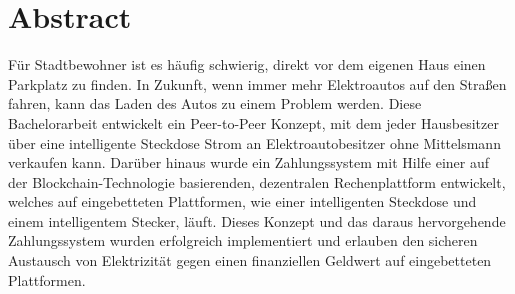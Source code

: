 \thispagestyle{empty}

\section*{Abstract}

Für Stadtbewohner ist es häufig schwierig, direkt vor dem eigenen Haus einen Parkplatz zu finden.
In Zukunft, wenn immer mehr Elektroautos auf den Straßen fahren, kann das Laden des Autos zu einem Problem werden.
Diese Bachelorarbeit entwickelt ein Peer-to-Peer Konzept, mit dem jeder Hausbesitzer über eine intelligente Steckdose Strom an Elektroautobesitzer ohne Mittelsmann verkaufen kann.
Darüber hinaus wurde ein Zahlungssystem mit Hilfe einer auf der Blockchain-Technologie basierenden, dezentralen Rechenplattform entwickelt, welches auf eingebetteten Plattformen, wie einer intelligenten Steckdose und einem intelligentem Stecker, läuft.
Dieses Konzept und das daraus hervorgehende Zahlungssystem wurden erfolgreich implementiert und erlauben den sicheren Austausch von Elektrizität gegen einen finanziellen Geldwert auf eingebetteten Plattformen.